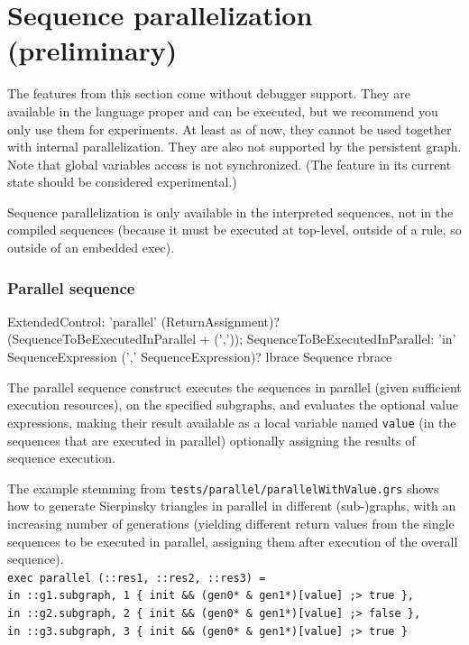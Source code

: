 \section{Sequence parallelization (preliminary)}\label{sec:sequenceparallelization}

\begin{warning}
The features from this section come without debugger support.
They are available in the language proper and can be executed, but we recommend you only use them for experiments.
At least as of now, they cannot be used together with internal parallelization.
They are also not supported by the persistent graph.
Note that global variables access is not synchronized.
(The feature in its current state should be considered experimental.)
\end{warning}

Sequence parallelization is only available in the interpreted sequences, not in the compiled sequences (because it must be executed at top-level, outside of a rule, so outside of an embedded exec).

\subsubsection*{Parallel sequence}

\begin{rail}
  ExtendedControl: 'parallel' (ReturnAssignment)? (SequenceToBeExecutedInParallel + (','));
	SequenceToBeExecutedInParallel: 'in' SequenceExpression (',' SequenceExpression)? lbrace Sequence rbrace
\end{rail}

The parallel sequence construct executes the sequences in parallel (given sufficient execution resources),
on the specified subgraphs, and evaluates the optional value expressions, making their result available as a local variable named \texttt{value} (in the sequences that are executed in parallel) optionally assigning the results of sequence execution.

\begin{example}
The example stemming from \texttt{tests/parallel/parallelWithValue.grs} shows how to generate Sierpinsky triangles in parallel in different (sub-)graphs, with an increasing number of generations (yielding different return values from the single sequences to be executed in parallel, assigning them after execution of the overall sequence).\\
\verb#exec parallel (::res1, ::res2, ::res3) = #\\
\verb#in ::g1.subgraph, 1 { init && (gen0* & gen1*)[value] ;> true },#\\
\verb#in ::g2.subgraph, 2 { init && (gen0* & gen1*)[value] ;> false },#\\
\verb#in ::g3.subgraph, 3 { init && (gen0* & gen1*)[value] ;> true }#
\end{example}

